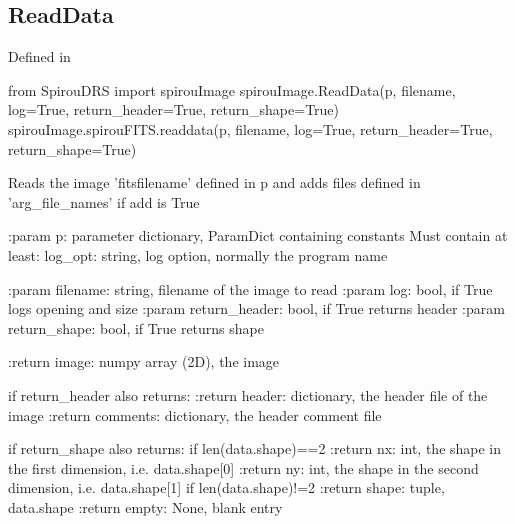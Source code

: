 \noindent\begin{minipage}{\textwidth}
\subsection{ReadData}

Defined in \spirouImage{}

\begin{pythonbox}
from SpirouDRS import spirouImage
spirouImage.ReadData(p, filename, log=True, return_header=True, return_shape=True)
spirouImage.spirouFITS.readdata(p, filename, log=True, return_header=True, return_shape=True)
\end{pythonbox}

\begin{pythondocstring}
Reads the image 'fitsfilename' defined in p and adds files defined in
'arg_file_names' if add is True

:param p: parameter dictionary, ParamDict containing constants
    Must contain at least:
            log_opt: string, log option, normally the program name

:param filename: string, filename of the image to read
:param log: bool, if True logs opening and size
:param return_header: bool, if True returns header
:param return_shape: bool, if True returns shape

:return image: numpy array (2D), the image

if return_header also returns:
    :return header: dictionary, the header file of the image
    :return comments: dictionary, the header comment file

if return_shape also returns:
    if len(data.shape)==2
        :return nx: int, the shape in the first dimension,
                    i.e. data.shape[0]
        :return ny: int, the shape in the second dimension,
                    i.e. data.shape[1]
    if len(data.shape)!=2
        :return shape: tuple, data.shape
        :return empty: None, blank entry
\end{pythondocstring}
\end{minipage}



